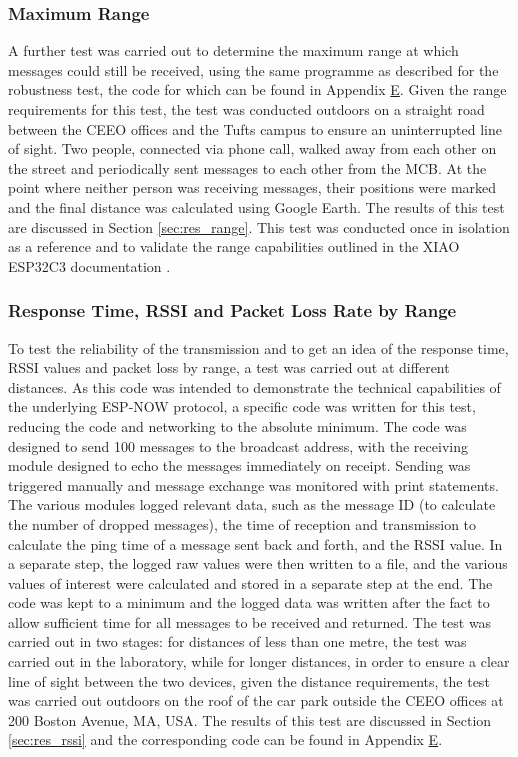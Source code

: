 \subsubsection{\label{sec:methods_test_range}Maximum Range}
A further test was carried out to determine the maximum range at which messages could still be received, using the same programme as described for the robustness test, the code for which can be found in Appendix \hyperref[chap:apx_e]{E}. Given the range requirements for this test, the test was conducted outdoors on a straight road between the CEEO offices and the Tufts campus to ensure an uninterrupted line of sight. 
Two people, connected via phone call, walked away from each other on the street and periodically sent messages to each other from the MCB. At the point where neither person was receiving messages, their positions were marked and the final distance was calculated using Google Earth. The results of this test are discussed in Section \ref{sec:res_range}. This test was conducted once in isolation as a reference and to validate the range capabilities outlined in the XIAO ESP32C3 documentation \citep{seeed_studio_seeed_2024-2}.

\subsubsection{\label{sec:methods_test_rssi}Response Time, RSSI and Packet Loss Rate by Range}
To test the reliability of the transmission and to get an idea of the response time, RSSI values and packet loss by range, a test was carried out at different distances. As this code was intended to demonstrate the technical capabilities of the underlying ESP-NOW protocol, a specific code was written for this test, reducing the code and networking to the absolute minimum. The code was designed to send 100 messages to the broadcast address, with the receiving module designed to echo the messages immediately on receipt. Sending was triggered manually and message exchange was monitored with print statements. The various modules logged relevant data, such as the message ID (to calculate the number of dropped messages), the time of reception and transmission to calculate the ping time of a message sent back and forth, and the RSSI value. In a separate step, the logged raw values were then written to a file, and the various values of interest were calculated and stored in a separate step at the end. The code was kept to a minimum and the logged data was written after the fact to allow sufficient time for all messages to be received and returned. The test was carried out in two stages: for distances of less than one metre, the test was carried out in the laboratory, while for longer distances, in order to ensure a clear line of sight between the two devices, given the distance requirements, the test was carried out outdoors on the roof of the car park outside the CEEO offices at 200 Boston Avenue, MA, USA. The results of this test are discussed in Section \ref{sec:res_rssi} and the corresponding code can be found in Appendix \hyperref[chap:apx_e]{E}.\\

